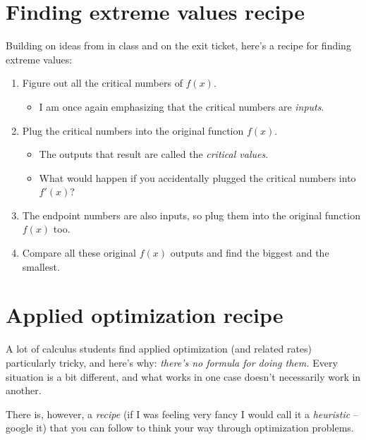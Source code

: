 \hrulefill
\section{Finding extreme values recipe}
Building on ideas from in class and on the exit ticket, here's a recipe for finding extreme values:

\begin{enumerate}[leftmargin=15pt]
    \item Figure out all the critical numbers of $f(x)$. 
    \begin{itemize}
        \item I am once again emphasizing that the critical numbers are \textit{inputs}.
    \end{itemize}
    \item Plug the critical numbers into the original function $f(x)$.
    \begin{itemize}
        \item The outputs that result are called the \textit{critical values}.
        \item What would happen if you accidentally plugged the critical numbers into $f'(x)$? 
    \end{itemize} 
    \item The endpoint numbers are also inputs, so plug them into the original function $f(x)$ too.
    \item Compare all these original $f(x)$ outputs and find the biggest and the smallest.
\end{enumerate}


\pagebreak

\section{Applied optimization recipe}
A lot of calculus students find applied optimization (and related rates) particularly tricky, and here's why: \textit{there's no formula for doing them.} Every situation is a bit different, and what works in one case doesn't necessarily work in another.

There is, however, a \textit{recipe} (if I was feeling very fancy I would call it a \textit{heuristic} -- google it) that you can follow to think your way through optimization problems.


